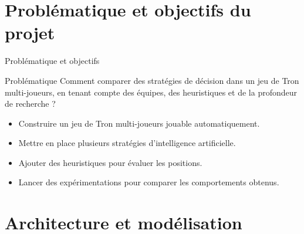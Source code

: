 \documentclass[10pt]{beamer}
\begin{document}
\section{Problématique et objectifs du projet}
\begin{frame}{Problématique et objectifs}
    \begin{block}{Problématique}
        Comment comparer des stratégies de décision dans un jeu de Tron multi-joueurs, en tenant compte des équipes, des heuristiques et de la profondeur de recherche ?
    \end{block}

    \begin{tcolorbox}[enhanced, arc=5pt, colback=softgreen, colframe=donecolor, title=Objectifs du projet]
        \begin{itemize}
            \item Construire un jeu de Tron multi-joueurs jouable automatiquement.
            \item Mettre en place plusieurs stratégies d'intelligence artificielle.
            \item Ajouter des heuristiques pour évaluer les positions.
            \item Lancer des expérimentations pour comparer les comportements obtenus.
        \end{itemize}
    \end{tcolorbox}
\end{frame}

\section{Architecture et modélisation}
\end{document}
